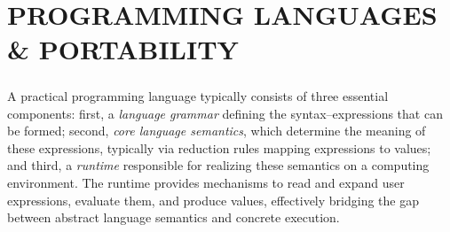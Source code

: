 \chapter[\texorpdfstring{PROGRAMMING LANGUAGES \& PORTABILITY}
                          {3. Linklets}]{PROGRAMMING LANGUAGES \& PORTABILITY}
\label{chapter:linklets}









	\paragraph{}%
  		A practical programming language typically consists of three essential components: first, a \emph{language grammar} defining the syntax--expressions that can be formed; second, \emph{core language semantics}, which determine the meaning of these expressions, typically via reduction rules mapping expressions to values; and third, a \emph{runtime} responsible for realizing these semantics on a computing environment. The runtime provides mechanisms to read and expand user expressions, evaluate them, and produce values, effectively bridging the gap between abstract language semantics and concrete execution.

